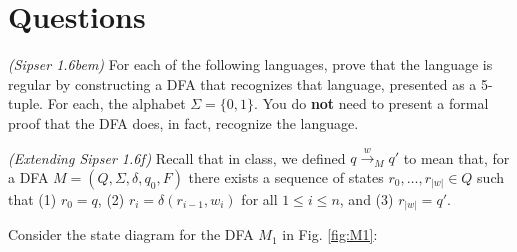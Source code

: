 \documentclass{exam}
\begin{document}
\section*{Questions}
\begin{questions}
    \question \textit{(Sipser 1.6bem)} For each of the following languages, prove that the language is regular by constructing a DFA that recognizes that language, presented as a 5-tuple. For each, the alphabet $\Sigma = \{0, 1\}$. You do \textbf{not} need to present a formal proof that the DFA does, in fact, recognize the language.

    \question \textit{(Extending Sipser 1.6f)} Recall that in class, we defined $q \xrightarrow{w}_{M} q'$ to mean that, for a DFA $M = (Q, \Sigma, \delta, q_0, F)$ there exists a sequence of states $r_0, \dots, r_{\lvert w \rvert} \in Q$ such that (1) $r_0 = q$, (2) $r_i = \delta(r_{i-1}, w_i)$ for all $1 \leq i \leq n$, and (3) $r_{\lvert w \rvert} = q'$.  
    
    Consider the state diagram for the DFA $M_1$ in Fig. \ref{fig:M1}:

    \begin{figure}[h]
    \centering
\end{figure}
\end{questions}
\end{document}

